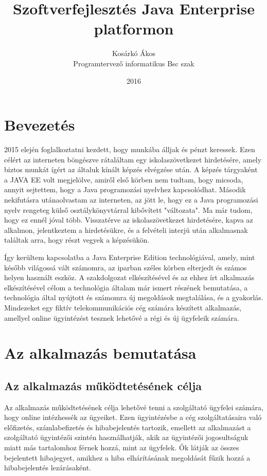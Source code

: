 \documentclass[centeredchapter]{thesis-ekf}
\institute{Matematikai és Informatikai Intézet}
\title{Szoftverfejlesztés Java Enterprise platformon}
\author{Kosárkó Ákos \\ Programtervező informatikus Bsc szak}
\date{2016}
\theoremstyle{definition}
\theoremstyle{remark}
\begin{document}
\maketitle
\tableofcontents


\chapter*{Bevezetés}

2015 elején foglalkoztatni kezdett, hogy munkába álljak és pénzt keressek. Ezen célért az interneten böngészve rátaláltam egy iskolaszövetkezet hirdetésére, amely biztos munkát ígért az általuk kínált képzés elvégzése után. A képzés tárgyaként a JAVA EE volt megjelölve, amiről első körben nem tudtam, hogy micsoda, annyit sejtettem, hogy a Java programozási nyelvhez kapcsolódhat. Második nekifutásra utánaolvastam az interneten, az jött le, hogy ez a Java programozási nyelv rengeteg külső osztálykönyvtárral kibővített "változata". Ma már tudom, hogy ez ennél jóval több. Visszatérve az iskolaszövetkezet hirdetésére, kapva az alkalmon, jelentkeztem a hirdetésükre, és a felvételi interjú után alkalmasnak találtak arra, hogy részt vegyek a képzésükön. 

Így kerültem kapcsolatba a Java Enterprise Edition technológiával, amely, mint később világossá vált számomra, az iparban széles körben elterjedt és számos helyen használt eszköz. A szakdolgozat elkészítésével és az ehhez írt alkalmazás elkészítésével célom a technológia általam már ismert részének bemutatása, a technológia által nyújtott és számomra új megoldások megtalálása, és a gyakorlás. Mindezeket egy fiktív telekommunikációs cég számára készített alkalmazás, amellyel online ügyintézést tesznek lehetővé a régi és új ügyfeleik számára.

\chapter{Az alkalmazás bemutatása}

\section{Az alkalmazás működtetésének célja}

Az alkalmazás működtetésének célja lehetővé tenni a szolgáltató ügyfelei számára, hogy online intézhessék az ügyeiket. Ezen ügyintézésbe a cég szolgáltatásaira való előfizetés, számlabefizetés és hibabejelentés tartozik, emellett az alkalmazást a szolgáltató ügyintézői szintén használhatják, akik az ügyintézői jogosultságuk miatt más tartalomhoz férnek hozzá, mint az ügyfelek. Ők látják az összes bejelentett hibajegyet, amikhez a hiba elhárításának megoldását fűzik hozzá a hibabejelentés lezárásaként. 
\end{document}
